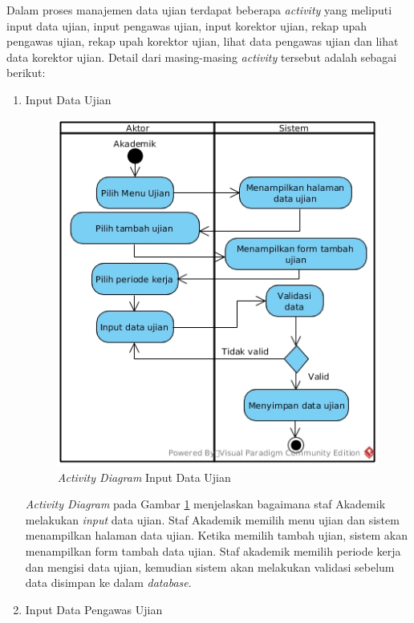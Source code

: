 \begin{enumerate}
            	Dalam proses manajemen data ujian terdapat beberapa \emph{activity} yang meliputi input data ujian, input pengawas ujian, input korektor ujian, rekap upah pengawas ujian, rekap upah korektor ujian, lihat data pengawas ujian dan lihat data korektor ujian. Detail dari masing-masing \emph{activity} tersebut adalah sebagai berikut: \newpage
            	\begin{enumerate}[label=\alph*.]
            	    \itemsep0em
            	    \item Input Data Ujian
            	    \begin{figure}[H]
            		    \centering            		    \includegraphics[width=11cm]{gambar/activity/input-data-ujian}
            		    \caption{\emph{Activity Diagram} Input Data Ujian}
            		    \label{activity_input_ujian}
            		\end{figure}
            		\emph{Activity Diagram} pada Gambar \ref{activity_input_ujian} menjelaskan bagaimana staf Akademik melakukan \emph{input} data ujian. Staf Akademik memilih menu ujian dan sistem menampilkan halaman data ujian. Ketika memilih tambah ujian, sistem akan menampilkan form tambah data ujian. Staf akademik memilih periode kerja dan mengisi data ujian, kemudian sistem akan melakukan validasi sebelum data disimpan ke dalam \emph{database}.\newpage
            		\item Input Data Pengawas Ujian
            		\begin{figure}[H]

\end{figure}
\end{enumerate}
\end{enumerate}
